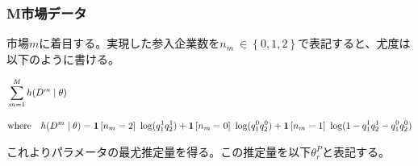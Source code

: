 \documentclass{jsarticle}
\begin{document}
\subsubsection{M市場データ}
市場$m$に着目する。実現した参入企業数を$n_m\ \in \left\{ 0,1,2 \right\}$で表記すると、尤度は以下のように書ける。

\begin{align*}
	&\sum_{m = 1}^M h(D^m \mid \theta)\\[10pt]
	&\text{where}\quad h(D^m \mid \theta) = {\bf 1}\left[ n_m = 2 \right]\ {\rm log} (q_1^1 q_2^1) + {\bf 1}\left[ n_m = 0 \right]\ {\rm log} (q_1^0 q_2^0) + {\bf 1}\left[ n_m = 1 \right]\ {\rm log} (1- q_1^1 q_2^1 - q_1^0 q_2^0)
\end{align*}

これよりパラメータの最尤推定量を得る。この推定量を以下$\theta_r^P$と表記する。
\end{document}
